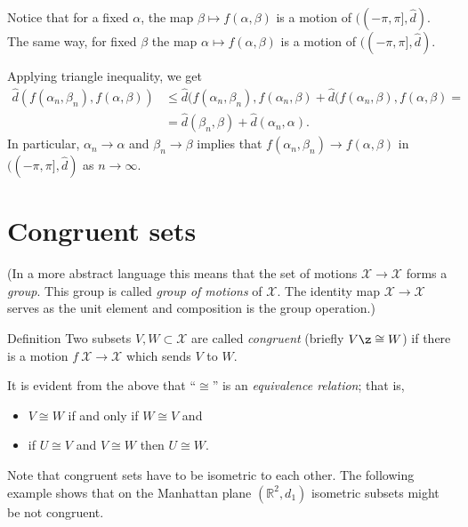 Notice that for a fixed $\alpha$,
 the map $\beta\mapsto f(\alpha,\beta)$ is a motion of $((-\pi,\pi],\hat d)$.
The same way, for fixed $\beta$ the map $\alpha\mapsto f(\alpha,\beta)$ is a motion of $((-\pi,\pi],\hat d)$.

Applying triangle inequality, we get
\begin{align*}
\hat d(f(\alpha_n,\beta_n),f(\alpha,\beta))
&\le\hat d(f(\alpha_n,\beta_n),f(\alpha_n,\beta)
+
\hat d(f(\alpha_n,\beta),f(\alpha,\beta)
=
\\
&=
\hat d(\beta_n,\beta)+\hat d(\alpha_n,\alpha).
\end{align*}
In particular, $\alpha_n\to\alpha$ and $\beta_n\to \beta$
implies that $f(\alpha_n,\beta_n)\to f(\alpha,\beta)$
in $((-\pi,\pi],\hat d)$ as $n\to\infty$.














\section*{Congruent sets}



(In a more abstract language this means that  the set of motions $\mathcal X\to\mathcal X$ forms a {}\emph{group}.
This group is called \emph{group of motions} of $\mathcal X$.
The identity map $\mathcal X\to\mathcal X$ serves as the unit element  and composition is the group operation.)

\begin{thm}{Definition}
Two subsets $V,W\subset \mathcal X$ are called \emph{congruent} (briefly \index{$\cong$}$V\z\cong W$)
if there is a motion $f\:\mathcal X\to\mathcal X$ which sends $V$ to $W$.
\end{thm}

It is evident from the above that ``$\cong$'' is an  \emph{equivalence relation};
that is, 
\begin{itemize}
\item $V\cong W$ if and only if $W\cong V$ and 
\item if $U\cong V$ and $V\cong W$ then $U\cong W$.
\end{itemize}


Note that congruent sets have to be isometric to each other.
The following example shows that on the Manhattan plane $(\mathbb{R}^2,d_1)$ isometric subsets might be not congruent.

